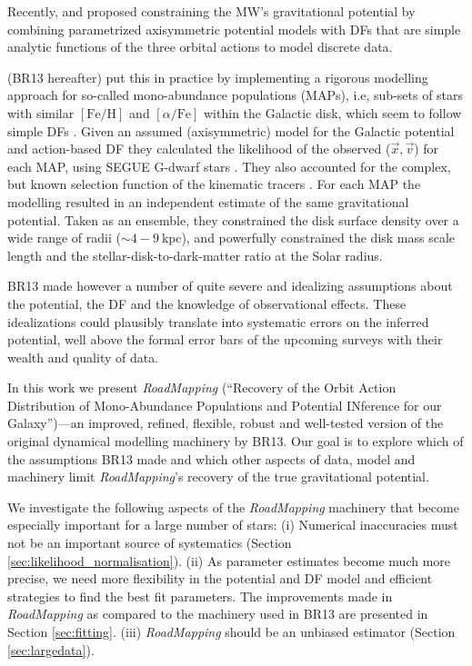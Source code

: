 \documentclass[iop,revtex4,numberedappendix,appendixfloats]{emulateapj}
\newcommand{\MAP}{MAP}
\newcommand{\MAPs}{MAPs}
\newcommand{\RM}{{\sl RoadMapping}}
\begin{document}
Recently, \citet{2012MNRAS.426.1328B} and \citet{2013ApJ...779..115B} proposed constraining the MW's gravitational potential by combining parametrized axisymmetric potential models with DFs that are simple analytic functions of the three orbital actions to model discrete data.

\citet{2013ApJ...779..115B} (BR13 hereafter) put this in practice by implementing a rigorous modelling approach for so-called mono-abundance populations (\MAPs{}), i.e, sub-sets of stars with similar $[\mathrm{Fe}/\mathrm{H}]$ and $[\alpha/\mathrm{Fe}]$ within the Galactic disk, which seem to follow simple DFs \citep{2012ApJ...751..131B,2012ApJ...755..115B,2012ApJ...753..148B}. Given an assumed (axisymmetric) model for the Galactic potential and action-based DF \citep{2010MNRAS.401.2318B,2011MNRAS.413.1889B,2013MNRAS.434..652T} they calculated the likelihood of the observed ($\vec{x},\vec{v}$) for each \MAP{}, using SEGUE G-dwarf stars \citep{2009AJ....137.4377Y}. They also accounted for the complex, but known selection function of the kinematic tracers \citep{2012ApJ...753..148B}. For each \MAP{} the modelling resulted in an independent estimate of the same gravitational potential. Taken as an ensemble, they constrained the disk surface density over a wide range of radii ($\sim 4-9~\text{kpc}$), and powerfully constrained the disk mass scale length and the stellar-disk-to-dark-matter ratio at the Solar radius. 

BR13 made however a number of quite severe and idealizing assumptions about the potential, the DF and the knowledge of observational effects. These idealizations could plausibly translate into systematic errors on the inferred potential, well above the formal error bars of the upcoming surveys with their wealth and quality of data.

In this work we present \RM{} (``\textsc{R}ecovery of the \textsc{O}rbit \textsc{A}ction \textsc{D}istribution of \textsc{M}ono-\textsc{A}bundance \textsc{P}opulations and \textsc{P}otential \textsc{IN}ference for our \textsc{G}alaxy'')---an improved, refined, flexible, robust and well-tested version of the original dynamical modelling machinery by BR13. Our goal is to explore which of the assumptions BR13 made and which other aspects of data, model and machinery limit \RM{}'s recovery of the true gravitational potential.

We investigate the following aspects of the \RM{} machinery that become especially important for a large number of stars: (i) Numerical inaccuracies must not be an important source of systematics (Section \ref{sec:likelihood_normalisation}). (ii) As parameter estimates become much more precise, we need more flexibility in the potential and DF model and efficient strategies to find the best fit parameters. The improvements made in \RM{} as compared to the machinery used in BR13 are presented in Section \ref{sec:fitting}. (iii) \RM{} should be an unbiased estimator (Section \ref{sec:largedata}).
\end{document}
